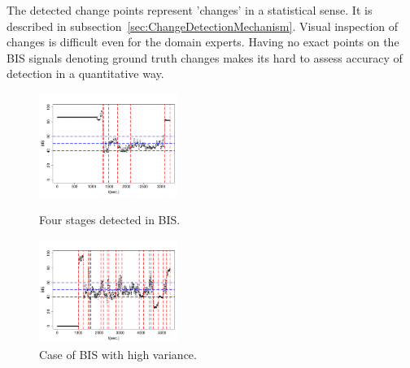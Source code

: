The detected change points represent 'changes' in a statistical
sense. It is described in subsection~\ref{sec:ChangeDetectionMechanism}.
Visual inspection of changes is difficult even for the domain experts.
Having no exact points on the BIS signals denoting ground truth
changes makes its hard to assess accuracy of detection in a
quantitative way.
\begin{figure}[htb!]
\centering
\includegraphics[width=0.40\textwidth]{./pics/aclac_paper/ChangeDetectionImage4.pdf}
\caption{Four stages detected in BIS.}
\label{fig:ChangeDetection1}
\centering
\includegraphics[width=0.40\textwidth]{./pics/aclac_paper/ChangeDetectionImage6.pdf}
\caption{Case of BIS with high variance.}
\label{fig:ChangeDetection2}
\end{figure}
